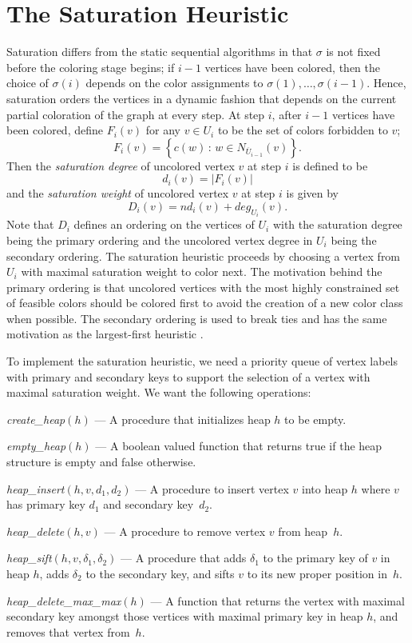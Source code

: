 \section{The Saturation Heuristic}
Saturation differs from the static sequential algorithms in that 
$\sigma$ is not fixed before the coloring stage begins; if $i-1$ vertices have
been colored, then the choice of $\sigma(i)$
depends on the color assignments to $\sigma(1), \ldots , \sigma(i-1)$.  
Hence, saturation orders the vertices in a dynamic fashion that depends on
the current partial coloration of the graph at every step.  At step
$i$, after $i-1$ vertices have been colored, define $F_i(v)$ for any 
$v \in U_i$ to be the set of colors forbidden to $v$;
\[
F_i(v) = \left\{ c(w) \, : \, w \in N_{\overline{U}_{i-1}}(v) \right\}.
\]
Then the {\em saturation degree\/} of uncolored vertex $v$ at step $i$ is
defined to be
\[
d_i(v) = \left| F_i(v) \right|
\]
and the {\em saturation weight\/} of uncolored vertex $v$ at step $i$ is given
by
\[
D_i(v) = n d_i(v) + deg_{U_i}(v) .
\]
Note that $D_i$ defines an ordering on the vertices of $U_i$ with the
saturation degree being the primary ordering and the uncolored vertex degree
in $U_i$ being the secondary ordering.  The saturation heuristic proceeds by
choosing a vertex from $U_i$ with maximal saturation weight to color next.  
The motivation behind the primary ordering is that uncolored vertices 
with the most highly constrained set of feasible colors should be colored
first to avoid the creation of a new color class when possible.
The secondary ordering is used to break ties and
has the same motivation as the largest-first heuristic \cite{DUN1976}.

To implement the saturation heuristic, we need a priority queue of
vertex labels with primary and secondary keys to support the selection of a
vertex with maximal saturation weight.   We want the following operations:
\begin{list}{}
   {\setlength{\labelwidth}{1.75in}
    \setlength{\leftmargin}{1.75in}
    \setlength{\rightmargin}{0in}
    \setlength{\labelsep}{0in}
   }
\item[{\em create\_heap\/$(h)$}\hfill] 
--- A procedure that initializes heap $h$ to be empty.
\item[{\em empty\_heap\/$(h)$}\hfill] 
--- A boolean valued function that returns true if the heap structure is empty 
and false otherwise.
\item[{\em heap\_insert\/$(h, v, d_1, d_2)$}\hfill]
--- A procedure to insert vertex 
$v$ into heap $h$ where $v$ has primary key $d_1$ and secondary key~$d_2$.
\item[{\em heap\_delete$(h, v)$}\hfill]
--- A procedure to remove vertex $v$ from heap~$h$.
\item[{\em heap\_sift\/$(h, v, \delta_1, \delta_2)$}\hfill]
--- A procedure that adds $\delta_1$ to the primary key of $v$ in
heap $h$, adds $\delta_2$ to the secondary key, and sifts $v$ to
its new proper position in~$h$.
\item[{\em heap\_delete\_max\_max\/$(h)$}\hfill]
--- A function that returns the vertex with maximal secondary 
key amongst those vertices with maximal
primary key in heap $h$, and removes that vertex from~$h$.
\end{list}

